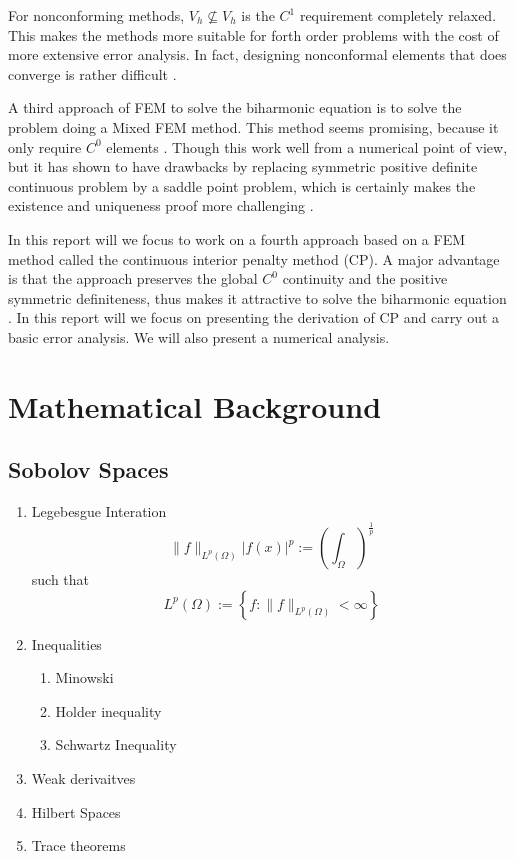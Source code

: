 For nonconforming methods, $V_{h} \not \subseteq  V_{h}$ is the $C^{1}$ requirement completely relaxed. This makes the methods more suitable for forth order problems with the cost of more extensive error analysis. In fact, designing nonconformal
elements that does converge is rather difficult \cite{shi02, nair21}.

A third approach of FEM to solve the biharmonic equation is to solve the problem doing a Mixed FEM method. This method seems promising, because it only require $C^{0}$ elements \cite{chen08, brezzi91}.
Though this work well from a numerical point of view, but it has shown to have drawbacks by replacing symmetric positive definite continuous problem
by a saddle point problem, which is certainly makes the existence and uniqueness proof more challenging \cite{brezzi74}.

In this report will we focus to work on a fourth approach based on a FEM method called the continuous interior penalty method (CP). A major advantage is that the approach preserves the global $C^{0}$ continuity and the positive symmetric definiteness, thus makes it attractive to solve the biharmonic equation \cite{brenner2012, brenner2012quadratic}. In this report will we focus on presenting the derivation of CP and carry out a basic error analysis. We will also present a numerical analysis.


\section{Mathematical Background}%
\label{sub:mathematical_background}

\subsection{Sobolov Spaces}%
\label{sub:sobolov_spaces}

\begin{enumerate}[label=(\roman*)]
    \item Legebesgue Interation
        \[
        \| f \|_{ L^{p}\left( \Omega  \right)  }\left\lvert f\left( x \right)  \right\rvert ^{ p }  := \left( \int_{\Omega }^{}   \right)^{\frac{1}{p}}
        \]
        such that \[
        L^{p} \left( \Omega  \right)  := \left\{ f: \| f \|_{ L^{p}\left( \Omega  \right)  }^{  } < \infty \right\}
        \]
    \item Inequalities
        \begin{enumerate}[label=\arabic*)]
            \item  Minowski
            \item Holder inequality
            \item Schwartz Inequality
        \end{enumerate}

    \item Weak derivaitves

    \item Hilbert Spaces

    \item Trace theorems
\end{enumerate}



